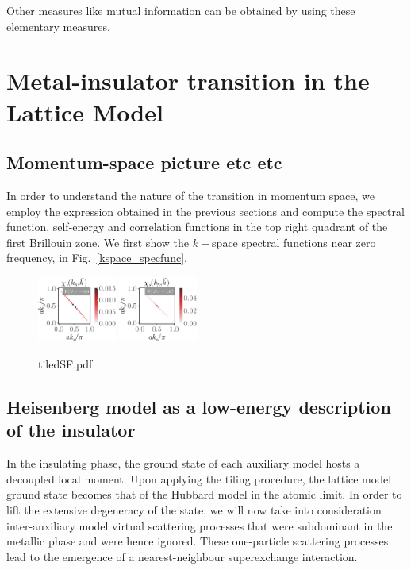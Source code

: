 \documentclass[reprint,hidelinks,onecolumn]{revtex4-2}
\begin{document}
Other measures like mutual information can be obtained by using these elementary measures.

\section{Metal-insulator transition in the Lattice Model}
\subsection{Momentum-space picture etc etc}
In order to understand the nature of the transition in momentum space, we employ the expression obtained in the previous sections and compute the spectral function, self-energy and correlation functions in the top right quadrant of the first Brillouin zone. We first show the \(k-\)space spectral functions near zero frequency, in Fig.~\ref{kspace_specfunc}.
\begin{figure}[htpb]
	\centering
	\includegraphics[width=0.23\textwidth]{tiledSF-1.pdf}
	\includegraphics[width=0.23\textwidth]{tiledSF-2.pdf}
	\caption{tiledSF.pdf}
	\label{fig:tiledSF-pdf}
\end{figure}

\subsection{Heisenberg model as a low-energy description of the insulator}

In the insulating phase, the ground state of each auxiliary model hosts a decoupled local moment. Upon applying the tiling procedure, the lattice model ground state becomes that of the Hubbard model in the atomic limit. In order to lift the extensive degeneracy of the state, we will now take into consideration inter-auxiliary model virtual scattering processes that were subdominant in the metallic phase and were hence ignored. These one-particle scattering processes lead to the emergence of a nearest-neighbour superexchange interaction.
\end{document}

